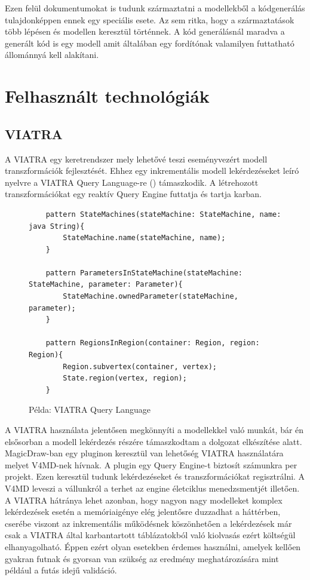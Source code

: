 Ezen felül dokumentumokat is tudunk származtatni a modellekből a kódgenerálás tulajdonképpen ennek egy speciális esete. Az sem ritka, hogy a származtatások több lépésen és modellen keresztül történnek. A kód generálásnál maradva a generált kód is egy modell amit általában egy fordítónak valamilyen futtatható állománnyá kell alakítani.


\section{Felhasznált technológiák}

\subsection[]{VIATRA\footnotemark}

A VIATRA egy keretrendszer mely lehetővé teszi eseményvezért modell transzformációk fejlesztését. Ehhez egy inkrementális modell lekérdezéseket leíró nyelvre a VIATRA Query Language-re () támaszkodik. A létrehozott transzformációkat egy reaktív Query Engine futtatja és tartja karban.

\begin{figure}[!ht]
	\begin{lstlisting}
	pattern StateMachines(stateMachine: StateMachine, name: java String){
	    StateMachine.name(stateMachine, name);
	}
	
	pattern ParametersInStateMachine(stateMachine: StateMachine, parameter: Parameter){
    	StateMachine.ownedParameter(stateMachine, parameter);
	}
	
	pattern RegionsInRegion(container: Region, region: Region){
	    Region.subvertex(container, vertex);
    	State.region(vertex, region);
	}
	\end{lstlisting}
	\caption{Példa: VIATRA Query Language}
	\label{fig:vql}
\end{figure}


A VIATRA használata jelentősen megkönnyíti a modellekkel való munkát, bár én elsősorban a modell lekérdezés részére támaszkodtam a dolgozat elkészítése alatt. MagicDraw-ban egy pluginon keresztül van lehetőség VIATRA használatára melyet V4MD-nek hívnak. A plugin egy Query Engine-t biztosít számunkra per projekt. Ezen keresztül tudunk lekérdezéseket és transzformációkat regisztrálni. A V4MD leveszi a vállunkról a terhet az engine életciklus menedzsmentjét illetően. A VIATRA hátránya lehet azonban, hogy nagyon nagy modelleket komplex lekérdezések esetén a memóriaigénye elég jelentősre duzzadhat a háttérben, cserébe viszont az inkrementális működésnek köszönhetően a lekérdezések már csak a VIATRA által karbantartott táblázatokból való kiolvasás ezért költségül elhanyagolható. Éppen ezért olyan esetekben érdemes használni, amelyek kellően gyakran futnak és gyorsan van szükség az eredmény meghatározására mint például a futás idejű validáció.

